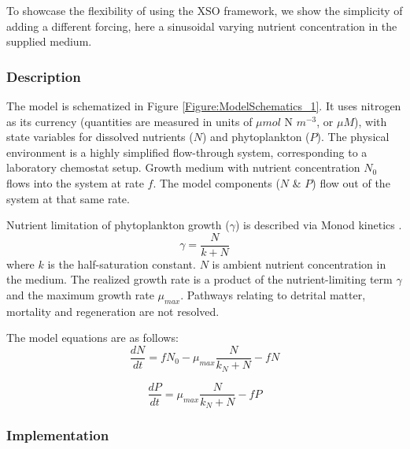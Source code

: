 \documentclass[journal abbreviation, manuscript]{copernicus}
\begin{document}
To showcase the flexibility of using the XSO framework, we show the simplicity of adding a different forcing, here a sinusoidal varying nutrient concentration in the supplied medium.

\subsubsection{Description}
The model is schematized in Figure \ref{Figure:ModelSchematics_1}. It uses nitrogen as its currency (quantities are measured in units of $\mu mol$ N $m^{-3}$, or $\mu M$), with state variables for dissolved nutrients ($N$) and phytoplankton ($P$). The physical environment is a highly simplified flow-through system, corresponding to a laboratory chemostat setup. Growth medium with nutrient concentration $N_0$ flows into the system at rate $f$. The model components ($N$ \& $P$) flow out of the system at that same rate.

Nutrient limitation of phytoplankton growth ($\gamma$) is described via Monod kinetics \citep{Monod1942RecherchesBacteriennes}.
\begin{equation}
    \gamma = \frac{N}{k + N} 
\end{equation}
where $k$ is the half-saturation constant. $N$ is ambient nutrient concentration in the medium.
The realized growth rate is a product of the nutrient-limiting term $\gamma$ and the maximum growth rate $\mu_{max}$.
Pathways relating to detrital matter, mortality and regeneration are not resolved. 

The model equations are as follows:
\begin{equation}
    \frac{d N}{d t} = 
    f N_0 %
    -  \mu_{max} \frac{N}{k_N + N} 
    - f N
\end{equation}

\begin{equation}
    \frac{d P}{d t} =
    \mu_{max} \frac{N}{k_N + N} 
    - f P
\end{equation}


\subsubsection{Implementation}
\end{document}

